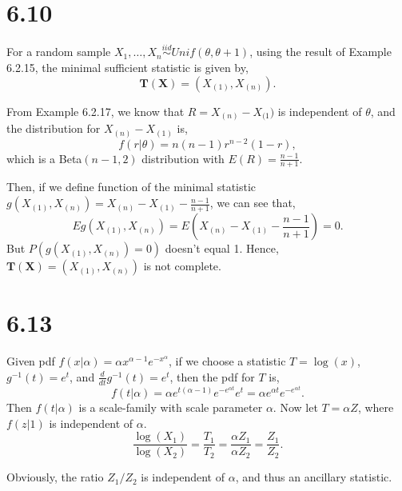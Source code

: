 \documentclass[letterpaper]{article}
\newcommand{\TX}{\mathbf{T(X)}}
\begin{document}
    \section*{6.10}
    For a random sample $X_1, \dots, X_n \stackrel{iid}{\sim} Unif(\theta, \theta+1)$, using the result of Example 6.2.15, the minimal sufficient statistic is given by,
    \[
    \TX = (X_{(1)}, X_{(n)}).
    \]

    From Example 6.2.17, we know that $R = X_{(n)} - X_{(1})$ is independent of $\theta$, and the distribution for $X_{(n)} - X_{(1)}$ is,
    \[
    f(r|\theta) = n(n-1)r^{n-2}(1-r),
    \]
    which is a Beta$(n-1, 2)$ distribution with $E(R) = \frac{n-1}{n+1}$. 

    Then, if we define function of the minimal statistic $g(X_{(1)}, X_{(n)}) = X_{(n)} - X_{(1)} - \frac{n-1}{n+1}$, 
    we can see that,
    \[
    Eg(X_{(1)}, X_{(n)}) = E(X_{(n)} - X_{(1)} - \frac{n-1}{n+1}) = 0.
    \]
    But $P(g(X_{(1)}, X_{(n)}) = 0)$ doesn't equal 1. Hence, $\TX = (X_{(1)}, X_{(n)})$ is not complete.

    \section*{6.13}
    Given pdf $f(x|\alpha) = \alpha x^{\alpha-1} e^{-x^\alpha}$,
    if we choose a statistic $T = \log(x)$, $g^{-1}(t) = e^t$, and $\frac{d}{dt} g^{-1}(t) = e^t$, then the pdf for $T$ is,
    \[
    f(t|\alpha) = \alpha e^{t(\alpha-1)} e^{-e^{\alpha t}} e^t = \alpha e^{\alpha t} e^{-e^{\alpha t}}.
    \]
    Then $f(t|\alpha)$ is a scale-family with scale parameter $\alpha$. Now let $T = \alpha Z$, where $f(z|1)$ is independent of $\alpha$. 
    \[
    \frac{\log(X_1)}{\log(X_2)} = \frac{T_1}{T_2} = \frac{\alpha Z_1}{\alpha Z_2} = \frac{Z_1}{Z_2}.
    \]

    Obviously, the ratio $Z_1/Z_2$ is independent of $\alpha$, and thus an ancillary statistic.
\end{document}
